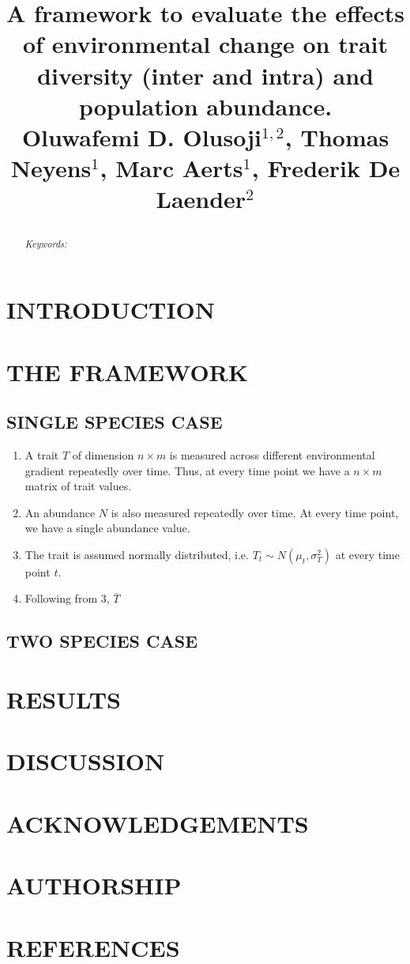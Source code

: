 \documentclass[a4paper,12pt]{article}
\title{
		\begin{flushleft} 
			\Huge{A framework to evaluate the effects of environmental change on trait diversity (inter and intra)
			and population abundance.} \\ 
		\vspace{0.4in} \small{Oluwafemi D. Olusoji$^{1,2}$, Thomas Neyens$^{1}$, Marc Aerts$^{1}$, Frederik De Laender$^{2}$}
		\end{flushleft}
	}
\date{}
\begin{document}
	\maketitle
	\newpage
	\begin{abstract}
			
		\noindent \textit{Keywords: }
	\end{abstract}
	
	
\section*{INTRODUCTION}

\section*{THE FRAMEWORK}

\subsection*{SINGLE SPECIES CASE}

\begin{enumerate}
	\item A trait $T$ of dimension $n \times m$ is measured across different environmental gradient repeatedly over time. Thus, at every time point we have a $n \times m$ matrix of trait values.
	\item An abundance $N$ is also measured repeatedly over time. At every time point, we have a single abundance value.
	\item The trait is assumed normally distributed, i.e. $T_t \sim N(\mu_t, \sigma^2_{T})$ at every time point $t$.
	\item Following from $3$, $\bar{T}$
\end{enumerate}

\subsection*{TWO SPECIES CASE}

\section*{RESULTS}

\section*{DISCUSSION}

\section*{ACKNOWLEDGEMENTS}

\section*{AUTHORSHIP}

\section*{REFERENCES}
	
	
\end{document}
